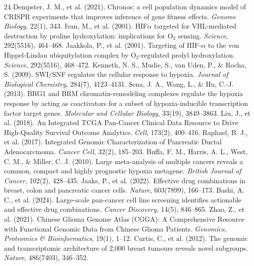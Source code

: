 \documentclass[10pt,twocolumn]{article}
\begin{document}
\vspace{-5pt}
\begingroup
\footnotesize
\begin{thebibliography}{24}
\setlength{\itemsep}{1pt}
\setlength{\parskip}{0pt}
 Dempster, J. M., et al. (2021). Chronos: a cell population dynamics model of CRISPR experiments that improves inference of gene fitness effects. \textit{Genome Biology}, 22(1), 343.
 Ivan, M., et al. (2001). HIF$\alpha$ targeted for VHL-mediated destruction by proline hydroxylation: implications for O$_2$ sensing. \textit{Science}, 292(5516), 464--468.
 Jaakkola, P., et al. (2001). Targeting of HIF-$\alpha$ to the von Hippel-Lindau ubiquitylation complex by O$_2$-regulated prolyl hydroxylation. \textit{Science}, 292(5516), 468--472.
 Kenneth, N. S., Mudie, S., van Uden, P., \& Rocha, S. (2009). SWI/SNF regulates the cellular response to hypoxia. \textit{Journal of Biological Chemistry}, 284(7), 4123--4131.
 Sena, J. A., Wang, L., \& Hu, C.-J. (2013). BRG1 and BRM chromatin-remodeling complexes regulate the hypoxia response by acting as coactivators for a subset of hypoxia-inducible transcription factor target genes. \textit{Molecular and Cellular Biology}, 33(19), 3849--3863.
 Liu, J., et al. (2018). An Integrated TCGA Pan-Cancer Clinical Data Resource to Drive High-Quality Survival Outcome Analytics. \textit{Cell}, 173(2), 400--416.
 Raphael, B. J., et al. (2017). Integrated Genomic Characterization of Pancreatic Ductal Adenocarcinoma. \textit{Cancer Cell}, 32(2), 185--203.
 Buffa, F. M., Harris, A. L., West, C. M., \& Miller, C. J. (2010). Large meta-analysis of multiple cancers reveals a common, compact and highly prognostic hypoxia metagene. \textit{British Journal of Cancer}, 102(2), 428--435.
 Jaaks, P., et al. (2022). Effective drug combinations in breast, colon and pancreatic cancer cells. \textit{Nature}, 603(7899), 166--173.
 Bashi, A. C., et al. (2024). Large-scale pan-cancer cell line screening identifies actionable and effective drug combinations. \textit{Cancer Discovery}, 14(5), 846--865.
 Zhao, Z., et al. (2021). Chinese Glioma Genome Atlas (CGGA): A Comprehensive Resource with Functional Genomic Data from Chinese Glioma Patients. \textit{Genomics, Proteomics \& Bioinformatics}, 19(1), 1--12.
 Curtis, C., et al. (2012). The genomic and transcriptomic architecture of 2,000 breast tumours reveals novel subgroups. \textit{Nature}, 486(7403), 346--352.

\end{thebibliography}
\end{document}
